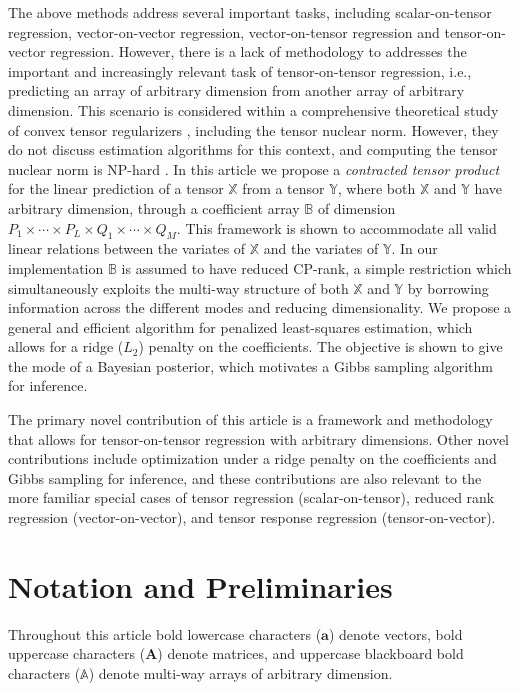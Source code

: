 \documentclass[12pt]{article}
\def\ctimes{\times \cdots \times}
\def\XX{\mathbb{X}}
\def\YY{\mathbb{Y}}
\def\AA{\mathbb{A}}
\def\BB{\mathbb{B}}
\begin{document}
 
The above methods address several important tasks, including scalar-on-tensor regression, vector-on-vector regression, vector-on-tensor regression and tensor-on-vector regression. However, there is a lack of methodology to addresses the important and increasingly relevant task of tensor-on-tensor regression, i.e., predicting an array of arbitrary dimension from another array of arbitrary dimension.  This scenario is considered within a comprehensive theoretical study of convex tensor regularizers \cite{raskutti2015convex}, including the tensor nuclear norm.  However, they do not discuss estimation algorithms for this context, and computing the tensor nuclear norm is  NP-hard \citep{sun2016sparse,friedland2014nuclear}. In this article we propose a \emph{contracted tensor product} for the linear prediction of a tensor $\XX$ from a tensor $\YY$, where both $\XX$ and $\YY$ have arbitrary dimension, through a coefficient array $\BB$ of dimension $P_1 \ctimes P_L \times Q_1 \ctimes Q_M$.  This framework is shown to accommodate all valid linear relations between the variates of $\XX$ and the variates of $\YY$.  In our implementation $\BB$ is assumed to have reduced CP-rank, a simple restriction which simultaneously exploits the multi-way structure of both $\XX$ and $\YY$ by borrowing information across the different modes and reducing dimensionality.  We propose a general and efficient algorithm for penalized least-squares estimation, which allows for a ridge ($L_2$) penalty on the coefficients.  The objective is shown to give the mode of a Bayesian posterior, which motivates a Gibbs sampling algorithm for inference.  

The primary novel contribution of this article is a framework and methodology that allows for tensor-on-tensor regression with arbitrary dimensions. Other novel contributions include optimization under a ridge penalty on the coefficients and Gibbs sampling for inference, and these contributions are also relevant to the more familiar special cases of tensor regression (scalar-on-tensor), reduced rank regression (vector-on-vector), and tensor response regression (tensor-on-vector).    

\section{Notation and Preliminaries}
\label{notation}

Throughout this article bold lowercase characters ($\mathbf{a}$) denote vectors, bold uppercase characters ($\mathbf{A}$) denote matrices, and uppercase blackboard bold characters ($\AA$) denote multi-way arrays of arbitrary dimension.  
\end{document}
